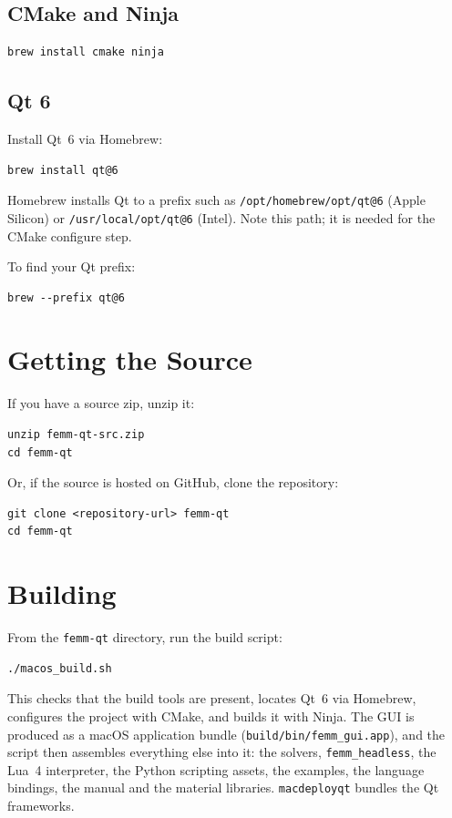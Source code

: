 \documentclass[11pt]{article}
\begin{document}
\subsection{CMake and Ninja}

\begin{lstlisting}
brew install cmake ninja
\end{lstlisting}

\subsection{Qt 6}

Install Qt~6 via Homebrew:
\begin{lstlisting}
brew install qt@6
\end{lstlisting}
Homebrew installs Qt to a prefix such as \texttt{/opt/homebrew/opt/qt@6}
(Apple Silicon) or \texttt{/usr/local/opt/qt@6} (Intel).  Note this path;
it is needed for the CMake configure step.

To find your Qt prefix:
\begin{lstlisting}
brew --prefix qt@6
\end{lstlisting}

\section{Getting the Source}

If you have a source zip, unzip it:
\begin{lstlisting}
unzip femm-qt-src.zip
cd femm-qt
\end{lstlisting}

Or, if the source is hosted on GitHub, clone the repository:
\begin{lstlisting}
git clone <repository-url> femm-qt
cd femm-qt
\end{lstlisting}

\section{Building}

From the \texttt{femm-qt} directory, run the build script:
\begin{lstlisting}
./macos_build.sh
\end{lstlisting}

This checks that the build tools are present, locates Qt~6 via
Homebrew, configures the project with CMake, and builds it with Ninja.
The GUI is produced as a macOS application bundle
(\texttt{build/bin/femm\_gui.app}), and the script then assembles
everything else into it: the solvers, \texttt{femm\_headless}, the Lua~4
interpreter, the Python scripting assets, the examples, the language
bindings, the manual and the material libraries.  \texttt{macdeployqt}
bundles the Qt frameworks.
\end{document}
